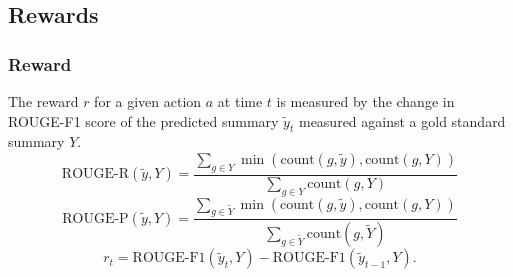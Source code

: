 \documentclass[]{beamer}
\begin{document}
	\subsection{Rewards}
	\begin{frame}
			\frametitle{Reward}
				The reward $r$ for a given action $a$ at time $t$ is measured by the change in ROUGE-F1 score of the predicted summary $\tilde{y}_{t}$ measured against a gold standard summary $Y$. 
	\begin{equation}
		 \textrm{ROUGE-R}(\tilde{y}, Y) = 
		    \frac{\sum_{g \in Y} 
		    \min \left(\textrm{count}(g, \tilde{y}), \textrm{count}(g, Y)\right)}{
		    \sum_{g \in Y} 
		    \textrm{count}(g, Y)
	    }
	\end{equation}
	\begin{equation}
		 \textrm{ROUGE-P}(\tilde{y}, Y) = 
		    \frac{\sum_{g \in \tilde{Y}} 
		    \min \left(\textrm{count}(g, \tilde{y}), \textrm{count}(g, Y)\right)}{
		    \sum_{g \in \tilde{Y}} 
		    \textrm{count}(g, \tilde{Y})
	    }
	\end{equation}
				\begin{equation}
					r_t = \textrm{ROUGE-F1}(\tilde{y}_{t}, Y) -  \textrm{ROUGE-F1}(\tilde{y}_{t-1}, Y).
				\end{equation}
	\end{frame}
\end{document}
